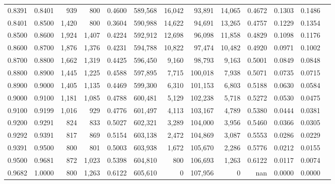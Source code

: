 \begin{tabular}{rrrrrrrrrrrrr}
0.8391 & 0.8401 &    939 &   800 &                                     0.4600 & 589,568 &  16,042 &  93,891 &  14,065 & 0.4672 & 0.1303 & 0.1486 \\
0.8401 & 0.8500 &  1,420 &   800 &                                     0.3604 & 590,988 &  14,622 &  94,691 &  13,265 & 0.4757 & 0.1229 & 0.1354 \\
0.8500 & 0.8600 &  1,924 & 1,407 &                                     0.4224 & 592,912 &  12,698 &  96,098 &  11,858 & 0.4829 & 0.1098 & 0.1176 \\
0.8600 & 0.8700 &  1,876 & 1,376 &                                     0.4231 & 594,788 &  10,822 &  97,474 &  10,482 & 0.4920 & 0.0971 & 0.1002 \\
0.8700 & 0.8800 &  1,662 & 1,319 &                                     0.4425 & 596,450 &   9,160 &  98,793 &   9,163 & 0.5001 & 0.0849 & 0.0848 \\
0.8800 & 0.8900 &  1,445 & 1,225 &                                     0.4588 & 597,895 &   7,715 & 100,018 &   7,938 & 0.5071 & 0.0735 & 0.0715 \\
0.8900 & 0.9000 &  1,405 & 1,135 &                                     0.4469 & 599,300 &   6,310 & 101,153 &   6,803 & 0.5188 & 0.0630 & 0.0584 \\
0.9000 & 0.9100 &  1,181 & 1,085 &                                     0.4788 & 600,481 &   5,129 & 102,238 &   5,718 & 0.5272 & 0.0530 & 0.0475 \\
0.9100 & 0.9199 &  1,016 &   929 &                                     0.4776 & 601,497 &   4,113 & 103,167 &   4,789 & 0.5380 & 0.0444 & 0.0381 \\
0.9200 & 0.9291 &    824 &   833 &                                     0.5027 & 602,321 &   3,289 & 104,000 &   3,956 & 0.5460 & 0.0366 & 0.0305 \\
0.9292 & 0.9391 &    817 &   869 &                                     0.5154 & 603,138 &   2,472 & 104,869 &   3,087 & 0.5553 & 0.0286 & 0.0229 \\
0.9391 & 0.9500 &    800 &   801 &                                     0.5003 & 603,938 &   1,672 & 105,670 &   2,286 & 0.5776 & 0.0212 & 0.0155 \\
0.9500 & 0.9681 &    872 & 1,023 &                                     0.5398 & 604,810 &     800 & 106,693 &   1,263 & 0.6122 & 0.0117 & 0.0074 \\
0.9682 & 1.0000 &    800 & 1,263 &                                     0.6122 & 605,610 &       0 & 107,956 &       0 &    nan & 0.0000 & 0.0000 \\
\bottomrule
\end{tabular}
